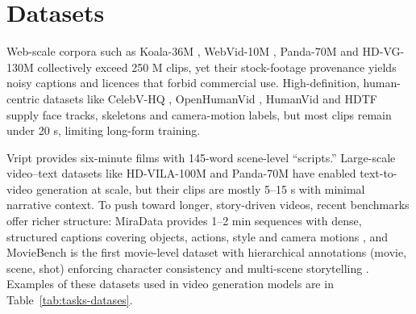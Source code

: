 \section{Datasets}
\label{sec:datasets}
Web-scale corpora such as Koala-36M \cite{koala36m2024}, WebVid-10M \cite{webvid10m2021}, Panda-70M \cite{panda70m2024} and HD-VG-130M \cite{hdvg130m2024} collectively exceed 250 M clips, yet their stock-footage provenance yields noisy captions and licences that forbid commercial use. High-definition, human-centric datasets like CelebV-HQ \cite{celebvhq2022}, OpenHumanVid \cite{openhvid2024}, HumanVid \cite{humanvid2024} and HDTF \cite{hdtf2021} supply face tracks, skeletons and camera-motion labels, but most clips remain under 20 s, limiting long-form training.

Vript \cite{vript2024} provides six-minute films with 145-word scene-level “scripts.” Large-scale video–text datasets like HD-VILA-100M \cite{hd-vila2022} and Panda-70M \cite{panda70m2024} have enabled text-to-video generation at scale, but their clips are mostly 5–15 s with minimal narrative context. To push toward longer, story-driven videos, recent benchmarks offer richer structure: MiraData provides 1–2 min sequences with dense, structured captions covering objects, actions, style and camera motions \cite{miradata2024}, and MovieBench is the first movie-level dataset with hierarchical annotations (movie, scene, shot) enforcing character consistency and multi-scene storytelling \cite{moviebench2025}. Examples of these datasets used in video generation models are in Table~\ref{tab:tasks-datases}.